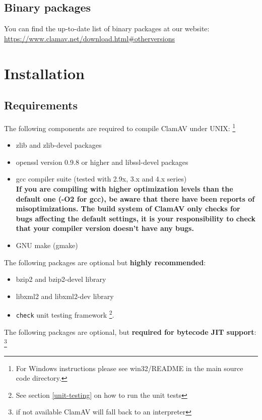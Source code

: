\documentclass[a4paper,titlepage,12pt]{article}
\begin{document}
    \subsection{Binary packages}
    You can find the up-to-date list of binary packages at our website:
    \url{https://www.clamav.net/download.html#otherversions}

    \section{Installation}

    \subsection{Requirements}\label{sec:components}
    The following components are required to compile ClamAV under UNIX:
    \footnote{For Windows instructions please see win32/README in the
    main source code directory.}
    \begin{itemize}
	\item zlib and zlib-devel packages
    \item openssl version 0.9.8 or higher and libssl-devel packages
	\item gcc compiler suite (tested with 2.9x, 3.x and 4.x series)\\
	      \textbf{If you are compiling with higher optimization levels
	      than the default one (\hbox{-O2} for gcc), be aware that there
	      have been reports of misoptimizations. The build system of ClamAV
	      only checks for bugs affecting the default settings, it is your
	      responsibility to check that your compiler version doesn't
	      have any bugs.}
    \item GNU make (gmake)
    \end{itemize}
    The following packages are optional but \textbf{highly recommended}:
    \begin{itemize}
	\item bzip2 and bzip2-devel library
        \item libxml2 and libxml2-dev library
	\item \verb+check+ unit testing framework \footnote{See section \ref{unit-testing} on how to run the unit tests}.
    \end{itemize}
    The following packages are optional, but \textbf{required for bytecode JIT support}:
    \footnote{if not available ClamAV will fall back to an interpreter}
\end{document}
